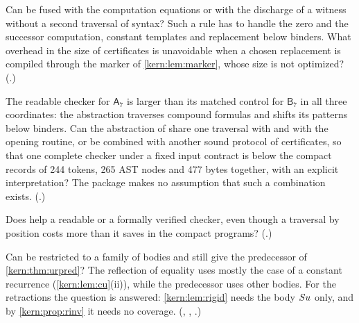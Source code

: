 \begin{question}
\label{kern:q:brepfuse}
Can  be fused with the computation equations or with the
discharge of a witness without a second traversal of syntax?  Such a rule
has to handle the zero and the successor computation, constant templates and
replacement below binders.  What overhead in the size of certificates is
unavoidable when a chosen replacement is compiled through the marker of
\cref{kern:lem:marker}, whose size is not optimized?
(.)
\end{question}

\begin{question}
\label{kern:q:aqesize}
The readable checker for $\mathsf{A}_7$ is larger than its matched control
for $\mathsf{B}_7$ in all three coordinates: the abstraction traverses
compound formulas and shifts its patterns below binders.  Can the
abstraction of  share one traversal with  and
with the opening routine, or be combined with another sound protocol of
certificates, so that one complete checker under a fixed input contract is
below the compact records of 244 tokens, 265 AST nodes and 477 bytes
together, with an explicit interpretation?  The package makes no assumption
that such a combination exists.  (.)
\end{question}

\begin{question}
\label{kern:q:lor}
Does  help a readable or a formally verified checker, even
though a traversal by position costs more than it saves in the compact
programs?  (.)
\end{question}

\begin{question}
\label{kern:q:urweak}
Can  be restricted to a family of bodies and still give the
predecessor of \cref{kern:thm:urpred}?  The reflection of equality uses
mostly the case of a constant recurrence (\cref{kern:lem:cu}(ii)), while the
predecessor uses other bodies.  For the retractions the question is
answered: \cref{kern:lem:rigid} needs the body $S u$ only, and by
\cref{kern:prop:rinv} it needs no coverage.
(, , .)
\end{question}


